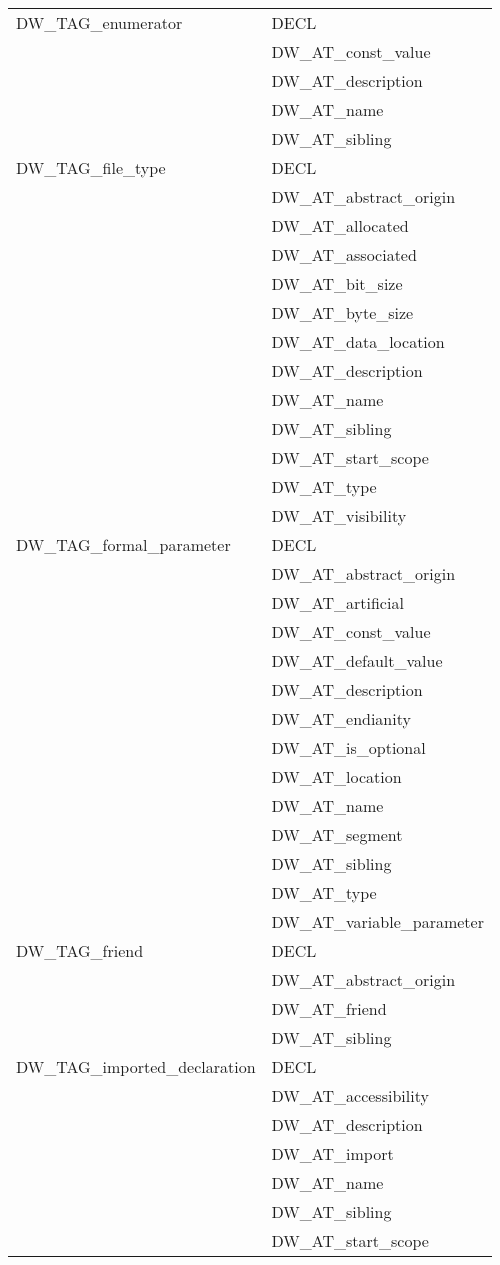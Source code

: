 \begin{longtable}{l|p{8cm}}
DW\_TAG\_enumerator
&DECL \\
&DW\_AT\_const\_value \\
&DW\_AT\_description \\
&DW\_AT\_name \\
&DW\_AT\_sibling \\

DW\_TAG\_file\_type
&DECL \\
&DW\_AT\_abstract\_origin \\
&DW\_AT\_allocated \\
&DW\_AT\_associated \\
&DW\_AT\_bit\_size \\
&DW\_AT\_byte\_size \\
&DW\_AT\_data\_location \\
&DW\_AT\_description \\
&DW\_AT\_name \\
&DW\_AT\_sibling \\
&DW\_AT\_start\_scope \\
&DW\_AT\_type \\
&DW\_AT\_visibility \\

DW\_TAG\_formal\_parameter
&DECL \\
&DW\_AT\_abstract\_origin \\
&DW\_AT\_artificial \\
&DW\_AT\_const\_value \\
&DW\_AT\_default\_value \\
&DW\_AT\_description \\
&DW\_AT\_endianity \\
&DW\_AT\_is\_optional \\
&DW\_AT\_location \\
&DW\_AT\_name \\
&DW\_AT\_segment \\
&DW\_AT\_sibling \\
&DW\_AT\_type \\
&DW\_AT\_variable\_parameter \\

DW\_TAG\_friend
&DECL \\
&DW\_AT\_abstract\_origin \\
&DW\_AT\_friend \\
&DW\_AT\_sibling \\

DW\_TAG\_imported\_declaration
&DECL \\
&DW\_AT\_accessibility \\
&DW\_AT\_description \\
&DW\_AT\_import \\
&DW\_AT\_name \\
&DW\_AT\_sibling \\
&DW\_AT\_start\_scope \\


\end{longtable}
